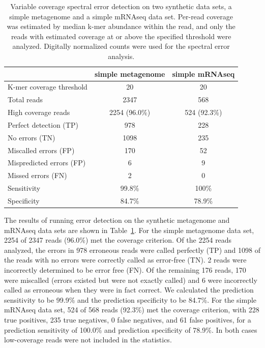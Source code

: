 \documentclass{article}
\begin{document}

\begin{table}
\begin{tabular}{|l|c||c|}
\hline
& simple metagenome & simple mRNAseq \\
\hline
K-mer coverage threshold & 20 & 20 \\
Total reads & 2347 & 568 \\
High coverage reads & 2254 (96.0\%) & 524 (92.3\%) \\
\hline
Perfect detection (TP) & 978 & 228 \\
No errors (TN) & 1098 & 235 \\
Miscalled errors (FP) & 170 & 52 \\
Mispredicted errors (FP) & 6 & 9 \\
Missed errors (FN) & 2 & 0 \\
\hline
Sensitivity & 99.8\% & 100\% \\
Specificity & 84.7\% & 78.9\% \\
\hline
\end{tabular}

\caption{Variable coverage spectral error detection on two synthetic
  data sets, a simple metagenome and a simple mRNAseq data set.
  Per-read coverage was estimated by median k-mer abundance within the
  read, and only the reads with estimated coverage at or above the
  specified threshold were analyzed.  Digitally normalized counts were
  used for the spectral error analysis.}
\label{tab:spectra_variable}
\end{table}

The results of running error detection on the synthetic metagenome and
mRNAseq data sets are shown in Table~\ref{tab:spectra_variable}. For the
simple metagenome data set, 2254 of 2347 reads (96.0\%) met the
coverage criterion.  Of the 2254 reads analyzed, the errors in 978
erroneous reads were called perfectly (TP) and 1098 of the reads with
no errors were correctly called as error-free (TN).  2 reads were
incorrectly determined to be error free (FN).  Of the remaining 176
reads, 170 were miscalled (errors existed but were not exactly called)
and 6 were incorrectly called as erroneous when they were in fact
correct.  We calculated the prediction sensitivity to be 99.9\% and
the prediction specificity to be 84.7\%.  For the simple mRNAseq data
set, 524 of 568 reads (92.3\%) met the coverage criterion, with 228
true positives, 235 true negatives, 0 false negatives, and 61 false
positives, for a prediction sensitivity of 100.0\% and prediction
specificity of 78.9\%.  In both cases low-coverage reads were not
included in the statistics.
\end{document}

